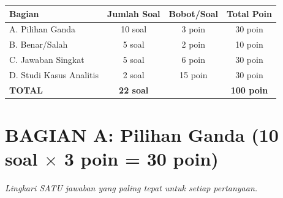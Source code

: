 \documentclass[12pt,a4paper]{report}
\begin{document}
\vspace{0.3cm}

\renewcommand{\arraystretch}{1.3}
\begin{center}
\small
\begin{tabularx}{0.85\textwidth}{@{} X c c c @{}}
\toprule
\textbf{Bagian} & \textbf{Jumlah Soal} & \textbf{Bobot/Soal} & \textbf{Total Poin} \\
\midrule
A. Pilihan Ganda & 10 soal & 3 poin & 30 poin \\
B. Benar/Salah & 5 soal & 2 poin & 10 poin \\
C. Jawaban Singkat & 5 soal & 6 poin & 30 poin \\
D. Studi Kasus Analitis & 2 soal & 15 poin & 30 poin \\
\midrule
\textbf{TOTAL} & \textbf{22 soal} & & \textbf{100 poin} \\
\bottomrule
\end{tabularx}
\end{center}
\renewcommand{\arraystretch}{1.0}

\newpage
\section{BAGIAN A: Pilihan Ganda (10 soal $\times$ 3 poin = 30 poin)}
\textit{Lingkari SATU jawaban yang paling tepat untuk setiap pertanyaan.}

\vspace{0.3cm}
\end{document}
